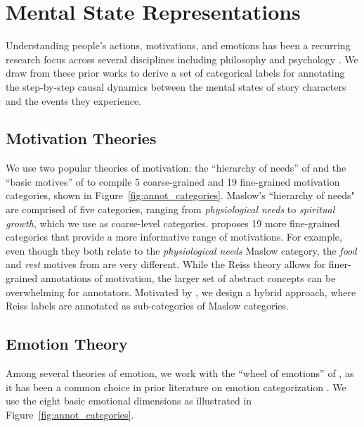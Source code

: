 \documentclass[11pt,a4paper]{article}
\begin{document}
 


\section{Mental State Representations}
Understanding people's actions, motivations, and emotions has been 
a recurring research focus across several disciplines including philosophy and psychology \cite{schachter1962cognitive,burke1969grammar,lazarus1991progress,goldman2015theory}. 
We draw from these prior works to derive a set of categorical labels for annotating the step-by-step causal dynamics between the mental states of story characters and the events they experience. 





\subsection{Motivation Theories}


We use two popular theories of motivation:  the ``hierarchy of needs'' of \citet{Maslow1943rl} and  the ``basic motives'' of \citet{Reiss2004ex} to compile 5 coarse-grained and 19 fine-grained motivation categories, shown in Figure~\ref{fig:annot_categories}.
Maslow's ``hierarchy of needs" are comprised of five categories, ranging from \textit{physiological needs} to \textit{spiritual growth}, which we use as coarse-level categories.
\citet{Reiss2004ex} proposes 19 more fine-grained categories that provide a more informative range of motivations. For example, even though they both relate to the \textit{physiological needs} Maslow category, the \textit{food} and \textit{rest} motives from \citet{Reiss2004ex} are very different. While the Reiss theory allows for finer-grained annotations of motivation, the larger set of abstract concepts can be overwhelming for annotators.  Motivated by \citet{reissMaslowWebsite}, we design a hybrid approach, where Reiss labels are annotated as sub-categories of Maslow categories.






\subsection{Emotion Theory} Among several theories of emotion, we work with the ``wheel of emotions'' of \citet{Plutchik1980jg}, as it has been a common choice in prior literature on emotion categorization \cite{MohammadEmoLex,Zhou2016Emotion}.  We use the eight basic emotional dimensions as illustrated in Figure~\ref{fig:annot_categories}.
\end{document}
